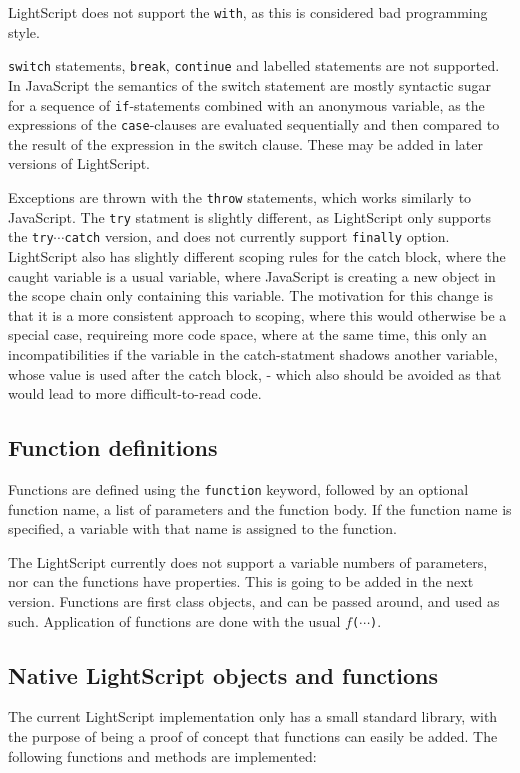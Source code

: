\documentclass[11pt]{report}
\begin{document}
LightScript does not support the \verb|with|, as this is considered bad programming style.

\verb|switch| statements, \verb|break|, \verb|continue| and labelled statements are not supported. In JavaScript the semantics of the switch statement are mostly syntactic sugar for a sequence of \verb|if|-statements combined with an anonymous variable, as the expressions of the \verb|case|-clauses are evaluated sequentially and then compared to the result of the expression in the switch clause.
These may be added in later versions of LightScript.

Exceptions are thrown with the \verb|throw| statements, which works similarly to JavaScript.
The \verb|try| statment is slightly different, as LightScript only supports the \verb|try|$\cdots$\verb|catch| version, and does not currently support \verb|finally| option.
LightScript also has slightly different scoping rules for the catch block, where the caught variable is a usual variable, where JavaScript is creating a new object in the scope chain only containing this variable. The motivation for this change is that it is a more consistent approach to scoping, where this would otherwise be a special case, requireing more code space, where at the same time, this only an incompatibilities if the variable in the catch-statment shadows another variable, whose value is used after the catch block, - which also should be avoided as that would lead to more difficult-to-read code.

\subsection{Function definitions}
Functions are defined using the \verb|function| keyword, followed by an optional function name, a list of parameters and the function body.
If the function name is specified, a variable with that name is assigned to the function.

The LightScript currently does not support a variable numbers of parameters, nor can the functions have properties.
This is going to be added in the next version.
Functions are first class objects, and can be passed around, and used as such. Application of functions are done with the usual $f$\verb|(|$\cdots$\verb|)|.

\subsection{Native LightScript objects and functions}
The current LightScript implementation only has a small standard library, with the purpose of being a proof of concept that functions can easily be added. The following functions and methods are implemented:
\end{document}
